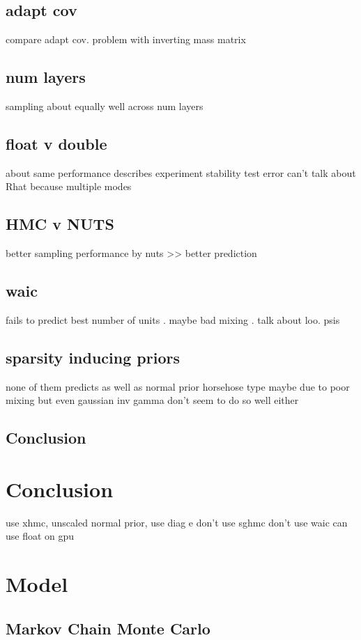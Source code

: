 \documentclass[]{report}
\begin{document}
\section{adapt cov}
compare adapt cov. problem with inverting mass matrix
\section{num layers}
sampling about equally well across num layers
\section{float v double}
about same performance describes experiment 
stability 
test error 
can't talk about Rhat because multiple modes 
\section{HMC v NUTS}
better sampling performance by nuts >> better prediction 
\section{waic}
fails to predict best number of units . maybe bad mixing . talk about loo. psis
\section{sparsity inducing priors}
none of them predicts as well as normal prior 
horsehose type maybe  due to poor mixing 
but even gaussian inv gamma don't seem to do so well either

\section{Conclusion}
\chapter{Conclusion}
use xhmc, unscaled normal prior, 
use diag e 
don't use sghmc
don't use waic 
can use float on gpu

\chapter{Model}

\section{Markov Chain Monte Carlo}
\end{document}
